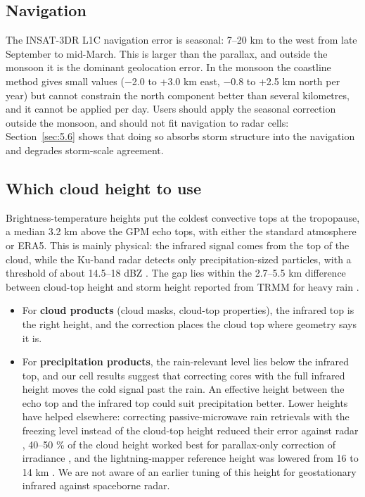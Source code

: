 \subsection{Navigation}\label{sec:6.3}

The INSAT-3DR L1C navigation error is seasonal: 7--20 km to the west from late September to mid-March. This is larger than the parallax, and outside the monsoon it is the dominant geolocation error. In the monsoon the coastline method gives small values (−2.0 to +3.0 km east, −0.8 to +2.5 km north per year) but cannot constrain the north component better than several kilometres, and it cannot be applied per day. Users should apply the seasonal correction outside the monsoon, and should not fit navigation to radar cells: Section~\ref{sec:5.6} shows that doing so absorbs storm structure into the navigation and degrades storm-scale agreement.

\subsection{Which cloud height to use}\label{sec:6.4}

Brightness-temperature heights put the coldest convective tops at the tropopause, a median 3.2 km above the GPM echo tops, with either the standard atmosphere or ERA5. This is mainly physical: the infrared signal comes from the top of the cloud, while the Ku-band radar detects only precipitation-sized particles, with a threshold of about 14.5--18 dBZ \citep{toyoshima2015}. The gap lies within the 2.7--5.5 km difference between cloud-top height and storm height reported from TRMM for heavy rain \citep{song2020}.

\begin{itemize}
\tightlist
\item
  For \textbf{cloud products} (cloud masks, cloud-top properties), the infrared top is the right height, and the correction places the cloud top where geometry says it is.
\item
  For \textbf{precipitation products}, the rain-relevant level lies below the infrared top, and our cell results suggest that correcting cores with the full infrared height moves the cold signal past the rain. An effective height between the echo top and the infrared top could suit precipitation better. Lower heights have helped elsewhere: correcting passive-microwave rain retrievals with the freezing level instead of the cloud-top height reduced their error against radar \citep{monsalve2026}, 40--50 \% of the cloud height worked best for parallax-only correction of irradiance \citep{wiltink2025}, and the lightning-mapper reference height was lowered from 16 to 14 km \citep{virts2020}. We are not aware of an earlier tuning of this height for geostationary infrared against spaceborne radar.
\end{itemize}

